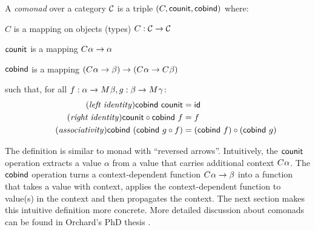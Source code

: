 \begin{definition}
A \emph{comonad} over a category $\mathcal{C}$ is a triple $(C, \textnormal{\sffamily counit}, \textnormal{\sffamily cobind})$ where:
\begin{compactitem}
\item $C$ is a mapping on objects (types) $C : \mathcal{C} \rightarrow \mathcal{C}$
\item $\textnormal{\sffamily counit}$ is a mapping $C^{}\alpha \rightarrow \alpha$ 
\item $\textnormal{\sffamily cobind}$ is a mapping $(C^{}\alpha \rightarrow \beta) 
  \rightarrow (C^{}\alpha \rightarrow C^{}\beta)$
\end{compactitem}
such that, for all $f:\alpha \rightarrow M^{}\beta, g:\beta \rightarrow M^{}\gamma$:
\begin{align}
\tag{\emph{left identity}}
  \ident{cobind}~\ident{counit} &= \idf{}
  \\
\tag{\emph{right identity}}
  \ident{counit} \circ \ident{cobind}~f &= f
  \\
\tag{\emph{associativity}}
  \ident{cobind}~(\ident{cobind}~g \circ f) &= (\ident{cobind}~f) \circ (\ident{cobind}~g)
\end{align}
\end{definition}

\noindent
The definition is similar to monad with ``reversed arrows''. Intuitively, the $\textnormal{\sffamily counit}$ 
operation extracts a value $\alpha$ from a value that carries additional context $C^{}\alpha$.
The $\textnormal{\sffamily cobind}$ operation turns a context-dependent function 
$C^{}\alpha \rightarrow \beta$ into a function that takes a value with context, applies
the context-dependent function to value(s) in the context and then propagates the context. The 
next section makes this intuitive definition more concrete. More detailed discussion about
comonads can be found in Orchard's PhD thesis \cite{comonads-dom-thesis}.



